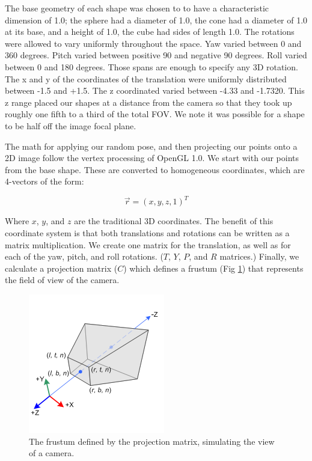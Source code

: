 \documentclass[journal]{IEEEtran}
\begin{document}
The base geometry of each shape was chosen to to have a characteristic dimension of 1.0; the sphere had a diameter of 1.0, the cone had a diameter of 1.0 at its base, and a height of 1.0, the cube had sides of length 1.0. The rotations were allowed to vary uniformly throughout the space. Yaw varied between 0 and 360 degrees. Pitch varied between positive 90 and negative 90 degrees. Roll varied between 0 and 180 degrees. Those spans are enough to specify any 3D rotation. The x and y of the coordinates of the translation were uniformly distributed between -1.5 and +1.5. The z coordinated varied between -4.33 and -1.7320. This z range placed our shapes at a distance from the camera so that they took up roughly one fifth to a third of the total FOV. We note it was possible for a shape to be half off the image focal plane.

The math for applying our random pose, and then projecting our points onto a 2D image follow the vertex processing of OpenGL 1.0. We start with our points from the base shape. These are converted to homogeneous coordinates, which are 4-vectors of the form:

\begin{equation}
\vec r = (x, y, z, 1)^T
\end{equation}

\noindent Where $x$, $y$, and $z$ are the traditional 3D coordinates.
The benefit of this coordinate system is that both translations and rotations can be written as a matrix multiplication. We create one matrix for the translation, as well as for each of the yaw, pitch, and roll rotations. ($T$, $Y$, $P$, and $R$ matrices.) Finally, we calculate a projection matrix ($C$) which defines a frustum (Fig \ref{openglFrustum}) that represents the field of view of the camera.

\begin{figure}
	\hspace{-10 ex}

	\centering
	\includegraphics[width=.8\linewidth]{gl_projectionmatrix01}

	\caption{The frustum defined by the projection matrix, simulating the view of a camera. \cite{opengl_image}}
	\label{openglFrustum}
\end{figure}
\end{document}
